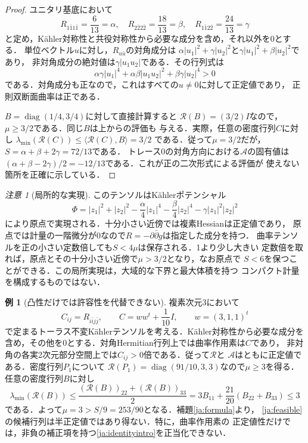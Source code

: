 \documentclass[12pt]{amsart}
\theoremstyle{definition}
\theoremstyle{remark}
\numberwithin{equation}{section}
\theoremstyle{plain}
\theoremstyle{remark}
\newtheorem{jrem}[thm]{注意}
\theoremstyle{definition}
\newtheorem{jeg}[thm]{例}
\begin{document}
\begin{proof}
ユニタリ基底において
\[
 R_{1\bar1 1\bar1}=\frac6{13}=\alpha,\quad
 R_{2\bar2 2\bar2}=\frac{18}{13}=\beta,\quad
 R_{1\bar1 2\bar2}=\frac{24}{13}=\gamma
\]
と定め，K\"ahler対称性と共役対称性から必要な成分を含め，それ以外を0とする．
単位ベクトル$u$に対し，$R_{u\bar u}$の対角成分は
$\alpha|u_1|^2+\gamma|u_2|^2$と$\gamma|u_1|^2+\beta|u_2|^2$であり，
非対角成分の絶対値は$\gamma|u_1u_2|$である．その行列式は
\[
 \alpha\gamma|u_1|^4+\alpha\beta|u_1u_2|^2
       +\beta\gamma|u_2|^4>0
\]
である．対角成分も正なので，これはすべての$u\ne0$に対して正定値であり，
正則双断面曲率は正である．

$B=\operatorname{diag}(1/4,3/4)$に対して直接計算すると
$\mathscr R(B)=(3/2)I$なので，$\mu\geq3/2$である．同じ$B$は上からの評価も
与える．実際，任意の密度行列$C$に対し
$\lambda_{\min}(\mathscr R(C))\leq\langle\mathscr R(C),B\rangle=3/2$
である．従って$\mu=3/2$だが，$S=\alpha+\beta+2\gamma=72/13$である．
トレース0の対角方向における$\mathcal A$の固有値は
$(\alpha+\beta-2\gamma)/2=-12/13$である．これが正の二次形式による評価が
使えない箇所を正確に示している．
\end{proof}

\begin{jrem}[局所的な実現]
このテンソルはK\"ahlerポテンシャル
\[
 \Phi=|z_1|^2+|z_2|^2-\frac\alpha4|z_1|^4
       -\frac\beta4|z_2|^4-\gamma|z_1|^2|z_2|^2
\]
により原点で実現される．十分小さい近傍では複素Hessianは正定値であり，
原点では計量の一階微分が0なので$R=-\partial\bar\partial g$は指定した成分を持つ．
曲率テンソルを正の小さい定数倍しても$S<4\mu$は保存される．1より少し大きい
定数倍を取れば，原点とその十分小さい近傍で$\mu>3/2$となり，なお原点で
$S<6$を保つことができる．この局所実現は，大域的な下界と最大体積を持つ
コンパクト計量を構成するものではない．
\end{jrem}

\begin{jeg}[凸性だけでは許容性を代替できない]\label{ja:boundary}
複素次元3において
\[
 C_{ij}=R_{i\bar i j\bar j},\qquad
 C=ww^t+\frac1{10}I,\qquad w=(3,1,1)^t
\]
で定まるトーラス不変K\"ahlerテンソルを考える．K\"ahler対称性から必要な成分を
含め，その他を0とする．対角Hermitian行列上では曲率作用素は$C$であり，
非対角の各実2次元部分空間上では$C_{ij}>0$倍である．従って$\mathscr R$と
$\mathcal A$はともに正定値である．密度行列$P_1$について
$\mathscr R(P_1)=\operatorname{diag}(91/10,3,3)$なので$\mu\geq3$を得る．
任意の密度行列$B$に対し
\[
 \lambda_{\min}(\mathscr R(B))
 \leq\frac{(\mathscr R(B))_{22}+(\mathscr R(B))_{33}}2
 =3B_{11}+\frac{21}{20}(B_{22}+B_{33})\leq3
\]
である．よって$\mu=3>S/9=253/90$となる．補題\ref{ja:formula}より，
\eqref{ja:feasible}の候補行列は半正定値ではあり得ない．特に，曲率作用素の
正定値性だけでは，非負の補正項を持つ\eqref{ja:identityintro}を正当化できない．
\end{jeg}
\end{document}
